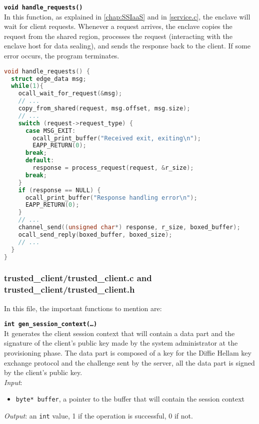 \noindent
\texttt{\bfseries void handle\_requests()}\\
In this function, as explained in \autoref{chap:SSIaaS} and in \autoref{service.c}, the enclave will wait for client requests. Whenever a request arrives, the enclave copies the request from the shared region, processes the request (interacting with the enclave host for data sealing), and sends the response back to the client. If some error occurs, the program terminates. \\

\begin{lstlisting}[language=C,frame=single]
void handle_requests() {
  struct edge_data msg;
  while(1){
    ocall_wait_for_request(&msg);
    // ...
    copy_from_shared(request, msg.offset, msg.size);
    // ...
    switch (request->request_type) {
      case MSG_EXIT:
        ocall_print_buffer("Received exit, exiting\n");
        EAPP_RETURN(0);
      break;
      default:
        response = process_request(request, &r_size);
      break;
    }
    if (response == NULL) {
      ocall_print_buffer("Response handling error\n");
      EAPP_RETURN(0);
    }
    // ...
    channel_send((unsigned char*) response, r_size, boxed_buffer);
    ocall_send_reply(boxed_buffer, boxed_size);
    // ... 
  }
}
\end{lstlisting}
    





\subsubsection{trusted\_client/trusted\_client.c and trusted\_client/trusted\_client.h}
In this file, the important functions to mention are:

\noindent
\texttt{\bfseries int gen\_session\_context(\dots)}\\
It generates the client session context that will contain a data part and the signature of the client's public key made by the system administrator at the provisioning phase. The data part is composed of a key for the Diffie Hellam key exchange protocol and the challenge sent by the server, all the data part is signed by the client's public key. \\
\textit{Input}:
\begin{itemize}[noitemsep,nolistsep]
  \item \texttt{byte* buffer}, a pointer to the buffer that will contain the session context
\end{itemize}
\textit{Output}: an \texttt{int} value, 1 if the operation is successful, 0 if not. \\


